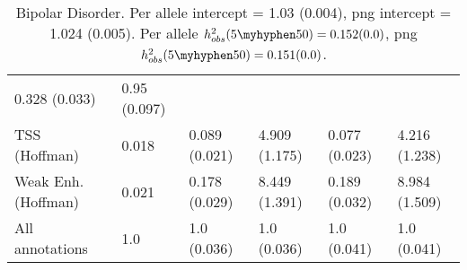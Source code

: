 \documentclass[11pt]{article}
\begin{document}
\begin{table}[H]
\begin{center}
\begin{tabular}{l|lllll}
0.328 (0.033) & 0.95 (0.097) \\
TSS (Hoffman)  &  0.018 & 0.089 (0.021) & 4.909 (1.175) &
0.077 (0.023) & 4.216 (1.238) \\
Weak Enh. (Hoffman)  &  0.021 & 0.178 (0.029) & 8.449 (1.391) &
0.189 (0.032) & 8.984 (1.509) \\
All annotations  &  1.0 & 1.0 (0.036) & 1.0 (0.036) &
1.0 (0.041) & 1.0 (0.041) \\
\end{tabular}
\caption{Bipolar Disorder.
Per allele intercept = 1.03 (0.004),
png intercept = 1.024 (0.005).
Per allele $h^2_{obs}(5\myhyphen50) = 0.152 (0.0)$,
png $h^2_{obs}(5\myhyphen50) = 0.151 (0.0)$.}
\end{center}
\end{table}
\end{document}
